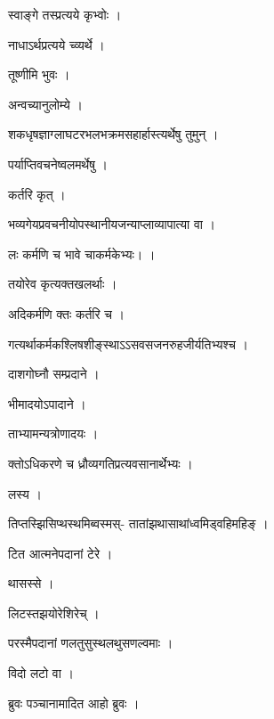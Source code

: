 \documentclass[10pt, openany, oneside]{book}
\begin{document}
\noindent स्वाङ्गे तस्प्रत्यये कृभ्वोः ।

\noindent नाधाऽर्थप्रत्यये च्व्यर्थे ।

\noindent तूष्णीमि भुवः ।

\noindent अन्वच्यानुलोम्ये ।

\noindent शकधृषज्ञाग्लाघटरभलभक्रमसहार्हास्त्यर्थेषु तुमुन् ।

\noindent पर्याप्तिवचनेष्वलमर्थेषु ।

\noindent कर्तरि कृत् ।

\noindent भव्यगेयप्रवचनीयोपस्थानीयजन्याप्लाव्यापात्या वा ।

\noindent लः कर्मणि च भावे चाकर्मकेभ्यः। ।

\noindent तयोरेव कृत्यक्तखलर्थाः ।

\noindent अदिकर्मणि क्तः कर्तरि च ।

\noindent गत्यर्थाकर्मकश्लिषशीङ्स्थाऽऽसवसजनरुहजीर्यतिभ्यश्च ।

\noindent दाशगोघ्नौ सम्प्रदाने ।

\noindent भीमादयोऽपादाने ।

\noindent ताभ्यामन्यत्रोणादयः ।

\noindent क्तोऽधिकरणे च ध्रौव्यगतिप्रत्यवसानार्थेभ्यः ।

\noindent लस्य ।

\noindent तिप्तस्झिसिप्थस्थमिब्वस्मस्- तातांझथासाथांध्वमिड्वहिमहिङ् ।

\noindent टित आत्मनेपदानां टेरे ।

\noindent थासस्से ।

\noindent लिटस्तझयोरेशिरेच् ।

\noindent परस्मैपदानां णलतुसुस्थलथुसणल्वमाः ।

\noindent विदो लटो वा ।

\noindent ब्रुवः पञ्चानामादित आहो ब्रुवः ।
\end{document}
